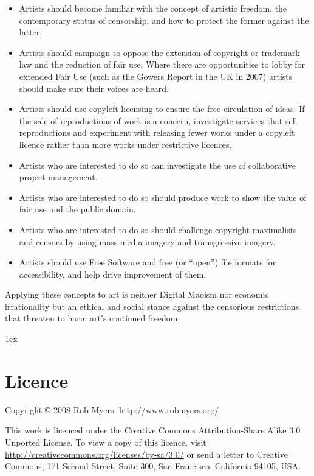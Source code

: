 \documentclass[11pt, a4]{article}
\begin{document}
\begin{itemize}

\item Artists should become familiar with the concept of artistic freedom, the contemporary status of censorship, and how to protect the former against the latter.

\item Artists should campaign to oppose the extension of copyright or trademark law and the reduction of fair use. Where there are opportunities to lobby for extended Fair Use (such as the Gowers Report in the UK in 2007) artists should make sure their voices are heard.

\item Artists should use copyleft licensing to ensure the free circulation of ideas. If the sale of reproductions of work is a concern, investigate services that sell reproductions and experiment with releasing fewer works under a copyleft licence rather than more works under restrictive licences.

\item Artists who are interested to do so can investigate the use of collaborative project management.

\item Artists who are interested to do so should produce work to show the value of fair use and the public domain.

\item Artists who are interested to do so should challenge copyright maximalists and censors by using mass media imagery and transgressive imagery.

\item Artists should use Free Software and free (or ``open'') file formats for accessibility, and help drive improvement of them.

\end{itemize}

Applying these concepts to art is neither Digital Maoism nor economic irrationality but an ethical and social stance against the censorious restrictions that threaten to harm art's continued freedom. 


\begingroup
\parindent 0pt
\parskip 1ex
\renewcommand{\enotesize}{\normalsize}
\theendnotes
\endgroup

\section {Licence}

Copyright \copyright{} 2008 Rob Myers. http://www.robmyers.org/

This work is licenced under the Creative Commons Attribution-Share Alike 3.0 Unported License. To view a copy of this licence, visit \url{http://creativecommons.org/licenses/by-sa/3.0/} or send a letter to Creative Commons, 171 Second Street, Suite 300, San Francisco, California 94105, USA.
\end{document}

